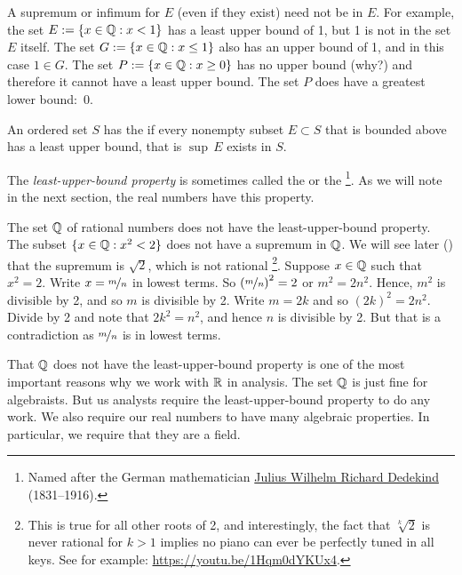 A supremum or infimum for $E$ (even if they exist) need not be
in $E$.  For example, the set $E := \{ x \in {\mathbb{Q}} : x < 1 \}$ has a least upper
bound of 1, but 1 is not in the set $E$ itself.
The set 
$G := \{ x \in {\mathbb{Q}} : x \leq 1 \}$ also has an upper bound of 1,
and in this case $1 \in G$.  
The set $P := \{ x \in {\mathbb{Q}} : x \geq 0 \}$ has no upper bound (why?) and therefore
it cannot have a least upper bound.  The set $P$ does have a greatest lower
bound:~0.

\begin{defn} \label{defn:lub}
An ordered set $S$ has the \emph{} if
every nonempty
subset $E \subset S$ that is bounded above has a least upper bound,
that is $\sup\, E$ exists in $S$.
\end{defn}

The \emph{least-upper-bound property}
is sometimes called the \emph{} or the
\emph{}%
\footnote{%
Named after the German mathematician
\href{https://en.wikipedia.org/wiki/Richard_Dedekind}{Julius Wilhelm Richard Dedekind}
(1831--1916).}.
As we will note in the
next section, the real numbers have this property.

\begin{example}
The set ${\mathbb{Q}}$ of rational numbers does not have the least-upper-bound property.  The subset
$\{ x \in {\mathbb{Q}} : x^2 < 2 \}$ does not have a supremum in ${\mathbb{Q}}$.  We will
see later () that the supremum is 
$\sqrt{2}$, which is not rational%
\footnote{This is true for all other roots of 2, and interestingly,
the fact that $\sqrt[k]{2}$ is never rational for $k > 1$ implies no piano can
ever be perfectly tuned in all keys.  See for example:
\url{https://youtu.be/1Hqm0dYKUx4}.}.
Suppose $x \in {\mathbb{Q}}$ such that $x^2 = 2$.
Write $x=\nicefrac{m}{n}$ in lowest terms.  So ${(\nicefrac{m}{n})}^2 = 2$
or
$m^2 = 2n^2$.  Hence, $m^2$ is divisible by 2, and so $m$ is divisible by
2.  Write $m = 2k$ and so ${(2k)}^2 = 2n^2$.  Divide by 2
and note that $2k^2 = n^2$, and hence $n$ is divisible by 2.  But that is a
contradiction as $\nicefrac{m}{n}$ is in lowest terms.
\end{example}

That ${\mathbb{Q}}$ does not have the least-upper-bound property is one of the most
important reasons why we work with ${\mathbb{R}}$ in analysis.  The set ${\mathbb{Q}}$
is just fine for algebraists.  But us analysts require the least-upper-bound
property to do any work.
We also require our real numbers to have many algebraic properties.  In
particular, we require that they are a field.


